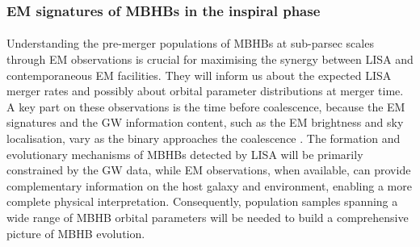 \documentclass[a4paper,12pt]{article}
\begin{document}
\subsubsection{EM signatures of MBHBs in the inspiral phase}

\paragraph{}
Understanding the pre-merger populations of MBHBs at sub-parsec scales through EM observations is crucial for maximising the synergy between LISA and contemporaneous EM facilities. They will inform us about the expected LISA merger rates and possibly about orbital parameter distributions at merger time. A key part on these observations is the time before coalescence, because the EM signatures and the GW information content, such as the EM brightness and sky localisation, vary as the binary approaches the coalescence \cite{mangiagli2020observing,mangiagli2022massive}. The formation and evolutionary mechanisms of MBHBs detected by LISA will be primarily constrained by the GW data, while EM observations, when available, can provide complementary information on the host galaxy and environment, enabling a more complete physical interpretation. Consequently, population samples spanning a wide range of MBHB orbital parameters will be needed to build a comprehensive picture of MBHB evolution.
\end{document}
